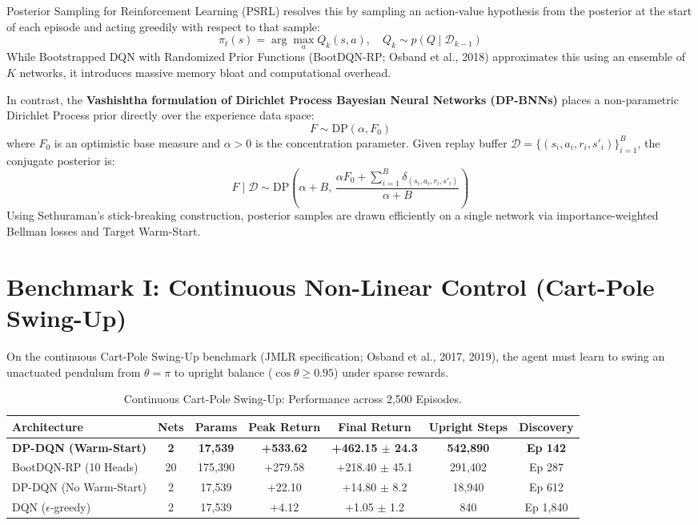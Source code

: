 \documentclass{article}
\begin{document}
Posterior Sampling for Reinforcement Learning (PSRL) resolves this by sampling an action-value hypothesis from the posterior at the start of each episode and acting greedily with respect to that sample:
\begin{equation}
    \pi_t(s) = \arg\max_{a} Q_k(s, a), \quad Q_k \sim p(Q \mid \mathcal{D}_{k-1})
\end{equation}
While Bootstrapped DQN with Randomized Prior Functions (BootDQN-RP; Osband et al., 2018) approximates this using an ensemble of $K$ networks, it introduces massive memory bloat and computational overhead.

In contrast, the \textbf{Vashishtha formulation of Dirichlet Process Bayesian Neural Networks (DP-BNNs)} places a non-parametric Dirichlet Process prior directly over the experience data space:
\begin{equation}
    F \sim \text{DP}(\alpha, F_0)
\end{equation}
where $F_0$ is an optimistic base measure and $\alpha > 0$ is the concentration parameter. Given replay buffer $\mathcal{D} = \{(s_i, a_i, r_i, s'_i)\}_{i=1}^B$, the conjugate posterior is:
\begin{equation}
    F \mid \mathcal{D} \sim \text{DP}\left(\alpha + B, \, \frac{\alpha F_0 + \sum_{i=1}^B \delta_{(s_i, a_i, r_i, s'_i)}}{\alpha + B}\right)
\end{equation}
Using Sethuraman's stick-breaking construction, posterior samples are drawn efficiently on a single network via importance-weighted Bellman losses and Target Warm-Start.

\section{Benchmark I: Continuous Non-Linear Control (Cart-Pole Swing-Up)}
On the continuous Cart-Pole Swing-Up benchmark (JMLR specification; Osband et al., 2017, 2019), the agent must learn to swing an unactuated pendulum from $\theta = \pi$ to upright balance ($\cos\theta \ge 0.95$) under sparse rewards.

\begin{table}[h]
\centering
\small
\caption{Continuous Cart-Pole Swing-Up: Performance across 2,500 Episodes.}
\begin{tabular}{lcccccc}
\toprule
\textbf{Architecture} & \textbf{Nets} & \textbf{Params} & \textbf{Peak Return} & \textbf{Final Return} & \textbf{Upright Steps} & \textbf{Discovery} \\
\midrule
\textbf{DP-DQN (Warm-Start)} & \textbf{2} & \textbf{17,539} & \textbf{+533.62} & \textbf{+462.15 $\pm$ 24.3} & \textbf{542,890} & \textbf{Ep 142} \\
BootDQN-RP (10 Heads) & 20 & 175,390 & +279.58 & +218.40 $\pm$ 45.1 & 291,402 & Ep 287 \\
DP-DQN (No Warm-Start) & 2 & 17,539 & +22.10 & +14.80 $\pm$ 8.2 & 18,940 & Ep 612 \\
DQN ($\epsilon$-greedy) & 2 & 17,539 & +4.12 & +1.05 $\pm$ 1.2 & 840 & Ep 1,840 \\
\bottomrule
\end{tabular}
\end{table}
\end{document}
